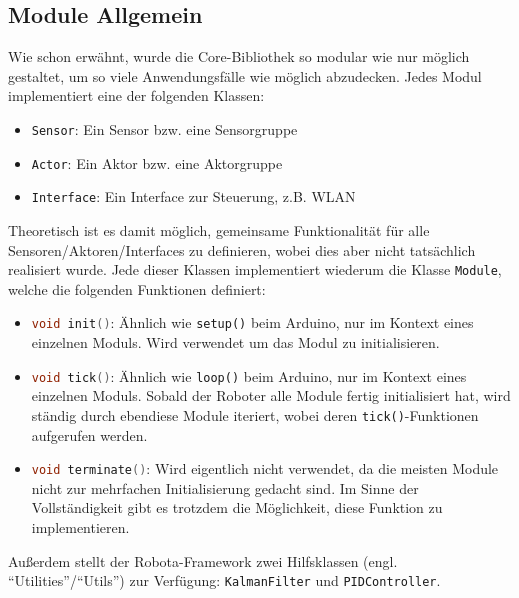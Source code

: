 \subsection{Module Allgemein}
\label{subsec:software_common_modules}
Wie schon erwähnt,
wurde die Core-Bibliothek so modular wie nur möglich gestaltet,
um so viele Anwendungsfälle wie möglich abzudecken.
%
Jedes Modul implementiert eine der folgenden Klassen:
\begin{itemize}
    \item \texttt{Sensor}: Ein Sensor bzw. eine Sensorgruppe
    \item \texttt{Actor}: Ein Aktor bzw. eine Aktorgruppe
    \item \texttt{Interface}: Ein Interface zur Steuerung, z.B. WLAN
\end{itemize}
Theoretisch ist es damit möglich,
gemeinsame Funktionalität für alle Sensoren/Aktoren/Interfaces zu definieren,
wobei dies aber nicht tatsächlich realisiert wurde.
%
Jede dieser Klassen implementiert wiederum die Klasse \texttt{Module},
welche die folgenden Funktionen definiert:
\begin{itemize}
    \item \lstinline[language=c]|void init()|:
        Ähnlich wie \texttt{setup()} beim Arduino, nur im Kontext eines einzelnen Moduls.
        Wird verwendet um das Modul zu initialisieren.
    \item \lstinline[language=c]|void tick()|:
        Ähnlich wie \texttt{loop()} beim Arduino, nur im Kontext eines einzelnen Moduls.
        Sobald der Roboter alle Module fertig initialisiert hat,
        wird ständig durch ebendiese Module iteriert,
        wobei deren \texttt{tick()}-Funktionen aufgerufen werden. 
    \item \lstinline[language=c]|void terminate()|:
        Wird eigentlich nicht verwendet,
        da die meisten Module nicht zur mehrfachen Initialisierung gedacht sind.
        Im Sinne der Vollständigkeit gibt es trotzdem die Möglichkeit,
        diese Funktion zu implementieren.
\end{itemize}
Außerdem stellt der Robota-Framework zwei Hilfsklassen (engl. ``Utilities''/``Utils'') zur Verfügung:
\texttt{KalmanFilter} und \texttt{PIDController}.

